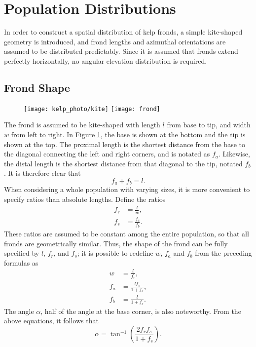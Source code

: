 \section{Population Distributions}
In order to construct a spatial distribution of kelp fronds, a simple kite-shaped geometry is introduced,
and frond lengths and azimuthal orientations are assumed to be distributed predictably.
Since it is assumed that fronds extend perfectly horizontally, no angular elevation distribution is required.

\subsection{Frond Shape}
\label{sec:shape}

\begin{figure}[h]
	\centering
  \texttt{[image: kelp\_photo/kite]}
  \qquad
	\texttt{[image: frond]}
	\label{fig:frond}
\end{figure}

The frond is assumed to be kite-shaped with length $l$ from base to tip, and width $w$ from left to right.
In Figure \ref{fig:frond}, the base is shown at the bottom and the tip is shown at the top.
The proximal length is the shortest distance from the base to the diagonal connecting the left and right corners, and is notated as $f_a$.
Likewise, the distal length is the shortest distance from that diagonal to the tip, notated $f_b$.
It is therefore clear that
 \begin{equation*}
	 f_a + f_b = l.
 \end{equation*}
When considering a whole population with varying sizes, it is more convenient to specify ratios than absolute lengths.
Define the ratios
\begin{align*}
	f_r &= \frac{l}{w}, \\
	f_s &= \frac{f_a}{f_b}.
\end{align*}
These ratios are assumed to be constant among the entire population, so that all fronds are geometrically similar.
Thus, the shape of the frond can be fully specified by $l$, $f_r$, and $f_s$;
it is possible to redefine $w$, $f_a$ and $f_b$ from the preceding formulas as
\begin{align*}
	w &= \frac{l}{f_r}, \\
	f_a &= \frac{lf_s}{1+f_s}, \\
	f_b &= \frac{l}{1+f_s}.
\end{align*}
The angle $\alpha$, half of the angle at the base corner, is also noteworthy.
From the above equations, it follows that 
\begin{equation*}
	\alpha = \tan^{-1}\left(\frac{2f_rf_s}{1+f_s}\right).
\end{equation*}

